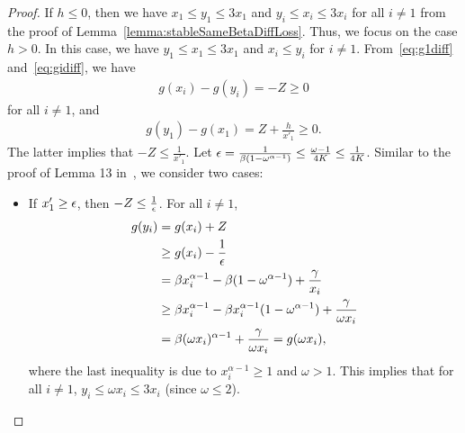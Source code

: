 \begin{proof}
    If $h \leq 0$, then we have $x_1 \leq y_1 \leq 3x_1$ and $y_i \leq x_i \leq 3x_i$ for all $i \neq 1$ from the proof of Lemma~\ref{lemma:stableSameBetaDiffLoss}. Thus, we focus on the case $h > 0$. 
    In this case, we have $y_1 \leq x_1 \leq 3x_1$ and $x_i \leq y_i$ for $i \neq 1$. From~\eqref{eq:g1diff} and~\eqref{eq:gidiff}, we have 
    \begin{align*}
        g(x_i) - g(y_i) = -Z \geq 0
    \end{align*}
    for all $i \neq 1$, and 
    \begin{align*}
        g(y_1) - g(x_1) = Z + \frac{h}{x'_1} \geq 0. 
    \end{align*}
    The latter implies that $-Z \leq \frac{1}{x'_1}$.
    Let ${\epsilon} = \frac{1}{\beta(1- \omega^{\alpha - 1})} \leq \frac{\omega - 1}{4K} \leq \frac{1}{4K}$. Similar to the proof of Lemma 13 in~\cite{ItoCOLT2024}, we consider two cases:
    \begin{itemize}
        \item If $x'_1 \geq {\epsilon}$, then $-Z \leq \frac{1}{{\epsilon}}$. For all $i \neq 1$,
        \begin{align*}
            g(y_i) &= g(x_i) + Z \\
            &\geq g(x_i) - \frac{1}{{\epsilon}} \\
            &= \beta x_i^{\alpha - 1} - \beta(1-\omega^{\alpha-1}) + \frac{\gamma}{x_i} \\
            &\geq \beta x_i^{\alpha - 1} - \beta x_i^{\alpha-1}(1-\omega^{\alpha-1}) + \frac{\gamma}{\omega x_i} \\
            &= \beta (\omega x_i)^{\alpha-1} + \frac{\gamma}{\omega x_i} = g(\omega x_i),
        \end{align*}
        where the last inequality is due to $x_i^{\alpha-1} \geq 1$ and $\omega > 1$. This implies that for all $i \neq 1$, $y_i \leq \omega x_i \leq 3x_i$ (since $\omega \leq 2$).



\end{itemize}
\end{proof}
